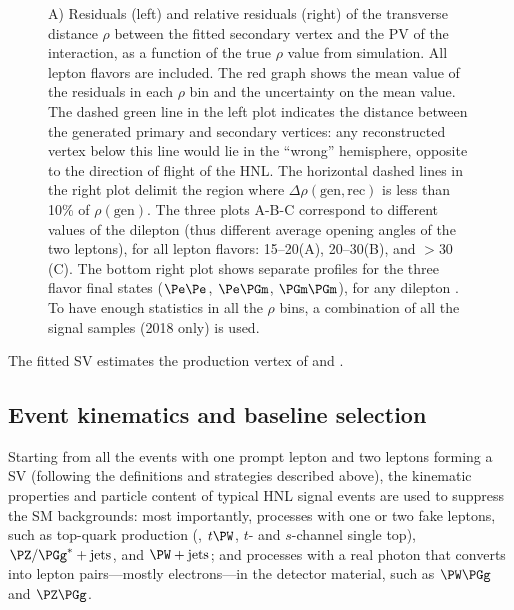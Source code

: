 \begin{figure}[t]
{  }
  \caption{A) Residuals (left) and relative residuals (right) of the
    transverse distance $\rho$ between the fitted secondary vertex and
    the PV of the interaction, as a function of the true $\rho$ value
    from simulation. All lepton flavors are included.
    The red graph shows the mean value of the
    residuals in each $\rho$ bin and the uncertainty on the mean
    value. The dashed green line in the left plot indicates the
    distance between the generated primary and secondary vertices: any
    reconstructed vertex below this line would lie in the ``wrong''
    hemisphere, opposite to the direction of flight of the HNL.
    The horizontal dashed lines in the right plot delimit the region
    where $\Delta\rho(\mathrm{gen,rec})$ is less than 10\% of
    $\rho(\mathrm{gen})$. 
    The three plots A-B-C correspond to
    different values of the dilepton \pt (thus different average
    opening angles of the two leptons), for all lepton flavors:
    15--20\GeV (A), 20--30\GeV (B), and $>$30\GeV
    (C). The bottom right plot shows separate profiles for
    the three flavor final states ($\Pe\Pe$, $\Pe\PGm$, $\PGm\PGm$),
    for any dilepton \pt.
    To have enough statistics in all the $\rho$ bins, a combination of
    all the signal samples (2018 only) is used.}
  \label{fig:svResidVsRho_all}
\end{figure}
The fitted SV estimates the production vertex of \ltwo and \lthree.

\clearpage
\subsection{Event kinematics and baseline selection}
\label{sec:llbaselinesel}

Starting from all the events with one prompt lepton and two \displ
leptons forming a SV (following the definitions and strategies
described above), the kinematic properties and particle content of
typical HNL signal events are used to suppress the SM backgrounds:
most importantly, processes with one or two fake leptons,
such as top-quark production
(\ttbar, $t\PW$, $t$- and $s$-channel single top),
\(\PZ/\PGg^{\ast}+\mathrm{jets}\), and \(\PW+\mathrm{jets}\);
and processes with a real photon that converts into lepton
pairs---mostly electrons---in the detector material, such as
$\PW\PGg$ and $\PZ\PGg$. \\

